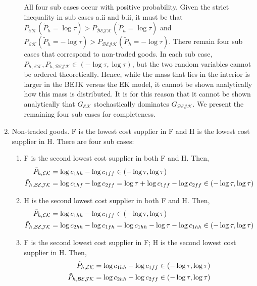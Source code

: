 \documentclass[12pt,dvips, ps2pdf]{article}
\begin{document}
\begin{appendix}
\begin{enumerate}
\begin{enumerate}
All four sub cases occur with positive probability. Given the strict inequality in sub cases a.ii and b.ii, it must be that $P_{\mathcal{EK}}(\tilde P_h =\log\tau) > P_{\mathcal{BEJK}}(\tilde P_h =\log\tau)$ and $P_{\mathcal{EK}}(\tilde P_h =-\log\tau) > P_{\mathcal{BEJK}}(\tilde P_h =-\log\tau)$. There remain four sub cases that correspond to non-traded goods. In each sub case, $P_{h, \mathcal{EK}},  P_{h, \mathcal{BEJK}}\in(-\log\tau,\log\tau)$, but the two random variables cannot be ordered theoretically. Hence, while the mass that lies in the interior is larger in the BEJK versus the EK model, it cannot be shown analytically how this mass is distributed. It is for this reason that it cannot be shown analytically that $G_{\mathcal{EK}}$ stochastically dominates $G_{\mathcal{BEJK}}$. We present the remaining four sub cases for completeness.

\end{enumerate}

\item Non-traded goods. F is the lowest cost supplier in F and H is the lowest cost supplier in H. There are four sub cases:

\begin{enumerate}
\item F is the second lowest cost supplier in both F and H. Then,
\begin{align}
\tilde P_{h, \mathcal{EK}}&=\log c_{1hh}-\log c_{1ff}\in(-\log\tau,\log\tau)\notag\\
\tilde P_{h, \mathcal{BEJK}}&=\log c_{1hf}-\log c_{2ff}=\log \tau +\log c_{1ff}-\log c_{2ff}\in(-\log\tau,\log\tau)\notag
\end{align}

\item H is the second lowest cost supplier in both F and H. Then,
\begin{align}
\tilde P_{h, \mathcal{EK}}&=\log c_{1hh}-\log c_{1ff}\in(-\log\tau,\log\tau)\notag\\
\tilde P_{h, \mathcal{BEJK}}&=\log c_{2hh}-\log c_{1fh}=\log c_{1hh}-\log \tau -\log c_{1hh}\in(-\log\tau,\log\tau)\notag
\end{align}

\item F is the second lowest cost supplier in F; H is the second lowest cost supplier in H. Then,
\begin{align}
\tilde P_{h, \mathcal{EK}}&=\log c_{1hh}-\log c_{1ff}\in(-\log\tau,\log\tau)\notag\\
\tilde P_{h, \mathcal{BEJK}}&=\log c_{2hh}-\log c_{2ff}\in(-\log\tau,\log\tau)\notag
\end{align}


\end{enumerate}
\end{enumerate}
\end{appendix}
\end{document}
